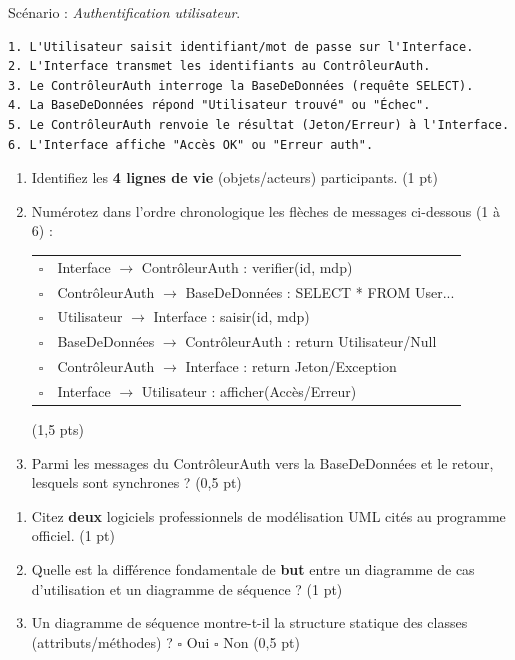 \documentclass[11pt]{article}
\begin{document}
\begin{exercice}
Scénario : \textit{Authentification utilisateur}.
\begin{verbatim}
1. L'Utilisateur saisit identifiant/mot de passe sur l'Interface.
2. L'Interface transmet les identifiants au ContrôleurAuth.
3. Le ContrôleurAuth interroge la BaseDeDonnées (requête SELECT).
4. La BaseDeDonnées répond "Utilisateur trouvé" ou "Échec".
5. Le ContrôleurAuth renvoie le résultat (Jeton/Erreur) à l'Interface.
6. L'Interface affiche "Accès OK" ou "Erreur auth".
\end{verbatim}
\begin{enumerate}
    \item Identifiez les \textbf{4 lignes de vie} (objets/acteurs) participants. \hfill (1 pt)
    \item Numérotez dans l'ordre chronologique les flèches de messages ci-dessous (1 à 6) :
\begin{tabular}{ll}
$\square$ & Interface $\rightarrow$ ContrôleurAuth : verifier(id, mdp) \\
$\square$ & ContrôleurAuth $\rightarrow$ BaseDeDonnées : SELECT * FROM User... \\
$\square$ & Utilisateur $\rightarrow$ Interface : saisir(id, mdp) \\
$\square$ & BaseDeDonnées $\rightarrow$ ContrôleurAuth : return Utilisateur/Null \\
$\square$ & ContrôleurAuth $\rightarrow$ Interface : return Jeton/Exception \\
$\square$ & Interface $\rightarrow$ Utilisateur : afficher(Accès/Erreur)
\end{tabular}
    \hfill (1,5 pts)
    \item Parmi les messages du ContrôleurAuth vers la BaseDeDonnées et le retour, lesquels sont synchrones ? \hfill (0,5 pt)
\end{enumerate}
\end{exercice}

\begin{exercice}
\begin{enumerate}
    \item Citez \textbf{deux} logiciels professionnels de modélisation UML cités au programme officiel. \hfill (1 pt)
    \item Quelle est la différence fondamentale de \textbf{but} entre un diagramme de cas d'utilisation et un diagramme de séquence ? \hfill (1 pt)
    \item Un diagramme de séquence montre-t-il la structure statique des classes (attributs/méthodes) ? \hfill $\square$ Oui \quad $\square$ Non \hfill (0,5 pt)
\end{enumerate}
\end{exercice}
\end{document}
